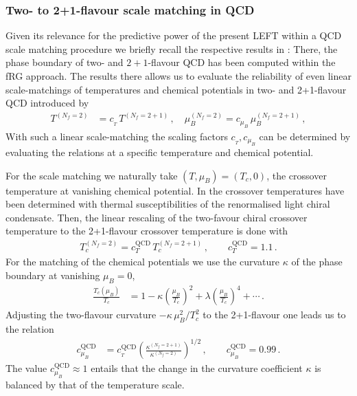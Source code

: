 \documentclass[%
reprint,
superscriptaddress,
showpacs,preprintnumbers,
amsmath,amssymb,
aps,
prd,
]{revtex4-1}
\begin{document}
\subsubsection{Two- to 2+1-flavour scale matching in QCD}	
Given its relevance for the predictive power of the present LEFT within a QCD scale matching procedure we briefly recall the respective results in \cite{Fu:2019hdw}: There, the phase boundary of two- and $2+1$-flavour QCD has been computed within the fRG approach. The results there allows us to evaluate the reliability of even linear scale-matchings of temperatures and chemical potentials in two- and 2+1-flavour QCD introduced by 
%
\begin{align}
T^{(N_f=2)} &=c_{_{T}}\,T^{(N_f=2+1)} \,, \quad \mu_B^{(N_f=2)} =c_{\mu_B}\,\mu_{B}^{(N_f=2+1)} \,,\label{eq:rescale}
\end{align}
%
With such a linear scale-matching the scaling factors $c_{_{T}}, c_{\mu_B}$ can be determined by evaluating the relations at a specific temperature and chemical potential. 

For the scale matching we naturally take $(T,\mu_B)=(T_c,0)$, the crossover temperature at vanishing chemical potential. In \cite{Fu:2019hdw} the crossover temperatures have been determined with thermal susceptibilities of the renormalised light chiral condensate. Then, the linear rescaling of the two-favour chiral crossover temperature to the 2+1-flavour crossover temperature is done with 
%
\begin{align}\label{eq:cTQCD}
T_c^{(N_f=2)} = c_T^{\textrm{QCD}}\, T_c^{(N_f=2+1)}\,, \qquad  c_T^{\textrm{QCD}}=1.1\,. 
\end{align} 
%
For the matching of the chemical potentials we use the curvature $\kappa$ of the phase boundary at vanishing $\mu_B=0$, 
%
\begin{align}
\frac{T_c(\mu_B)}{T_c}&=1-\kappa \left(\frac{\mu_B}{T_c}\right)^2+\lambda \left(\frac{\mu_B}{T_c}\right)^4+\cdots\,.\label{eq:curv}
\end{align}
% 
Adjusting the two-flavour curvature $-\kappa\, \mu_B^2/T_c^2$ to the 2+1-flavour one leads us to the relation 
%
\begin{align}
c^\textrm{QCD}_{\mu_B}&=c^{\textrm{QCD}}_{_{T}}\left(\frac{\kappa^{(N_f=2+1)}}{\kappa^{(N_f=2)}}\right)^{1/2}\,, \qquad c_{\mu_B}^\textrm{QCD}=0.99 \,.\label{eq:cmuQCD}
\end{align}
%
The value $c_{\mu_B}^\textrm{QCD}\approx 1$ entails that the change in the curvature coefficient $\kappa$ is balanced by that of the temperature scale.  
\end{document}
